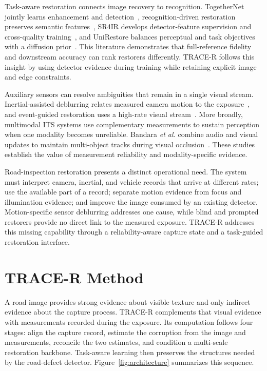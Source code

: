 \documentclass[journal]{IEEEtran}
\begin{document}
Task-aware restoration connects image recovery to recognition. TogetherNet jointly learns enhancement and detection~\cite{wang2022togethernet}, recognition-driven restoration preserves semantic features~\cite{yang2023vrdir}, SR4IR develops detector-feature supervision and cross-quality training~\cite{kim2024tdp}, and UniRestore balances perceptual and task objectives with a diffusion prior~\cite{chen2025unirestore}. This literature demonstrates that full-reference fidelity and downstream accuracy can rank restorers differently. TRACE-R follows this insight by using detector evidence during training while retaining explicit image and edge constraints.

Auxiliary sensors can resolve ambiguities that remain in a single visual stream. Inertial-assisted deblurring relates measured camera motion to the exposure~\cite{joshi2010imu,hu2016smartphoneimu,yang2025gyro}, and event-guided restoration uses a high-rate visual stream~\cite{kim2022eventexposure,kim2024cmta}. More broadly, multimodal ITS systems use complementary measurements to sustain perception when one modality becomes unreliable. Bandara \emph{et al.} combine audio and visual updates to maintain multi-object tracks during visual occlusion~\cite{bandara2026occlusion}. These studies establish the value of measurement reliability and modality-specific evidence.

Road-inspection restoration presents a distinct operational need. The system must interpret camera, inertial, and vehicle records that arrive at different rates; use the available part of a record; separate motion evidence from focus and illumination evidence; and improve the image consumed by an existing detector. Motion-specific sensor deblurring addresses one cause, while blind and prompted restorers provide no direct link to the measured exposure. TRACE-R addresses this missing capability through a reliability-aware capture state and a task-guided restoration interface.

\section{TRACE-R Method}
A road image provides strong evidence about visible texture and only indirect evidence about the capture process. TRACE-R complements that visual evidence with measurements recorded during the exposure. Its computation follows four stages: align the capture record, estimate the corruption from the image and measurements, reconcile the two estimates, and condition a multi-scale restoration backbone. Task-aware learning then preserves the structures needed by the road-defect detector. Figure~\ref{fig:architecture} summarizes this sequence.
\end{document}
